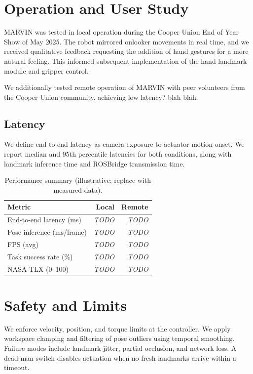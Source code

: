 \documentclass[manuscript,screen]{acmart} %
\begin{document}
\section{Operation and User Study}
MARVIN was tested in local operation during the Cooper Union End of 
Year Show of May 2025. The robot mirrored onlooker movements in real time, 
and we received qualitative feedback requesting the addition of hand 
gestures for a more natural feeling. This informed subsequent implementation 
of the hand landmark module and gripper control. 

We additionally tested remote operation of MARVIN with peer volunteers from the Cooper Union
community, achieving low latency? blah blah. %

\subsection{Latency}\label{sec:latency}
We define end-to-end latency as camera exposure to actuator motion onset. 
We report median and 95th percentile latencies for both conditions, 
along with landmark inference time and ROSBridge transmission time.

\begin{table}[htbp]
  \caption{Performance summary (illustrative; replace with measured data).}
  \label{tab:perf}
  \begin{tabular}{lrr}
    \toprule
    Metric & Local & Remote \\
    \midrule
    End-to-end latency (ms) &  \textit{TODO} & \textit{TODO} \\
    Pose inference (ms/frame) & \textit{TODO} & \textit{TODO} \\
    FPS (avg) & \textit{TODO} & \textit{TODO} \\
    Task success rate (\%) & \textit{TODO} & \textit{TODO} \\
    NASA-TLX (0--100) & \textit{TODO} & \textit{TODO} \\
    \bottomrule
  \end{tabular}
\end{table}

\section{Safety and Limits}
We enforce velocity, position, and torque limits at the controller. 
We apply workspace clamping and filtering of pose outliers using 
temporal smoothing. 
Failure modes include landmark jitter, partial occlusion, and network loss. 
A dead-man switch disables actuation when no fresh landmarks arrive 
within a timeout.
\end{document}
